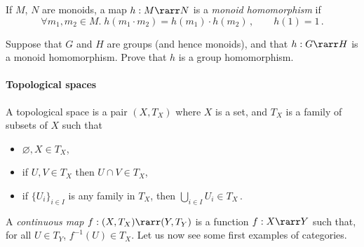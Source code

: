 \documentclass{svmult}
\begin{document}
If $M$, $N$ are monoids, a map $h:M\rarr N$ is a \emph{monoid homomorphism} if
\[ \forall m_1,m_2\in M.\;h(m_1\cdot m_2) = h(m_1)\cdot h(m_2)\,, \qquad h(1) = 1\,.  \]

\begin{myexercise}
\label{monhom}
Suppose that $G$ and $H$ are groups (and hence monoids), and that $h : G \rarr H$ is a monoid homomorphism. Prove that $h$ is a group homomorphism.
\end{myexercise}

\paragraph{Topological spaces}
A topological space is a pair $(X, T_{X})$ where $X$ is a set, and $T_{X}$ is a family of subsets of $X$ such that
\begin{itemize}
  \item $\varnothing,X \in T_{X}$,
  \item if $U, V \in T_{X}$ then $U \cap V \in T_{X}$,
  \item if $\{ U_{i} \}_{i \in I}$ is any family in $T_{X}$, then $\bigcup_{i \in I} U_{i} \in T_{X}$\,.
\end{itemize}
A \emph{continuous map} $f : (X, T_{X}) \rarr (Y, T_{Y})$ is a function $f : X \rarr Y$ such that, for all $U \in T_{Y}$, $f^{-1}(U) \in T_{X}$.
Let us now see some first examples of  categories.
\end{document}
